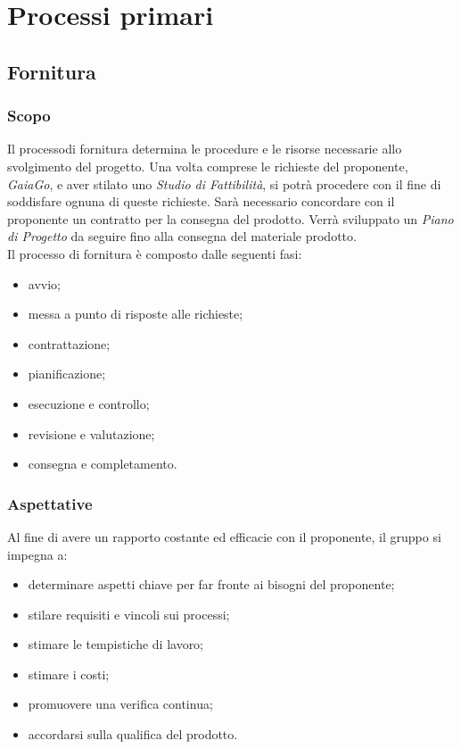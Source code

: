 \section{Processi primari}
\subsection{Fornitura}
\subsubsection{Scopo}
Il processo\glosp di fornitura determina le procedure e le risorse necessarie allo svolgimento del progetto. Una volta comprese le richieste del proponente, \textit{GaiaGo}, e aver stilato uno \textit{Studio di Fattibilità}, si potrà procedere con il fine di soddisfare ognuna di queste richieste. Sarà necessario concordare con il proponente un contratto per la consegna del prodotto. Verrà sviluppato un \textit{Piano di Progetto} da seguire fino alla consegna del materiale prodotto. \\
	Il processo di fornitura è composto dalle seguenti fasi:
	\begin{itemize}
		\item avvio;
		\item messa a punto di risposte alle richieste;
		\item contrattazione;
		\item pianificazione;
		\item esecuzione e controllo;
		\item revisione e valutazione;
		\item consegna e completamento.
	\end{itemize}
	\subsubsection{Aspettative}
	Al fine di avere un rapporto costante ed efficacie con il proponente, il gruppo si impegna a:
	\begin{itemize}
		\item determinare aspetti chiave per far fronte ai bisogni del proponente;
		\item stilare requisiti e vincoli sui processi;
		\item stimare le tempistiche di lavoro;
		\item stimare i costi;
		\item promuovere una verifica continua;		
		\item accordarsi sulla qualifica del prodotto.
	\end{itemize}
